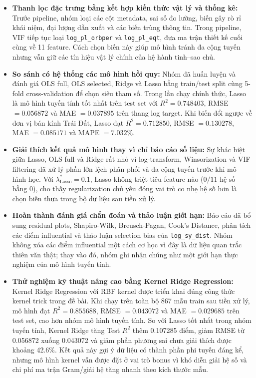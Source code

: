 \begin{itemize}[itemsep=0.15cm, topsep=0.1cm]
    \item \textbf{Thanh lọc đặc trưng bằng kết hợp kiến thức vật lý và thống kê:} Trước pipeline,
          nhóm loại các cột metadata, sai số đo lường, biến gây rò rỉ khái niệm, đại lượng dẫn
          xuất và các biến trùng thông tin. Trong pipeline, VIF tiếp tục loại
          \texttt{log\_pl\_orbper} và \texttt{log\_pl\_eqt}, đưa ma trận thiết kế cuối cùng về
          11 feature. Cách chọn biến này giúp mô hình tránh đa cộng tuyến nhưng vẫn giữ các tín
          hiệu vật lý chính của hệ hành tinh--sao chủ.

    \item \textbf{So sánh có hệ thống các mô hình hồi quy:} Nhóm đã huấn luyện và đánh giá
          OLS full, OLS selected, Ridge và Lasso bằng train/test split cùng 5-fold
          cross-validation để chọn siêu tham số. Trong lần chạy chính thức, Lasso là mô hình
          tuyến tính tốt nhất trên test set với $R^2=0.748403$, RMSE $=0.056872$ và
          MAE $=0.037895$ trên thang log target. Khi biến đổi ngược về đơn vị bán kính Trái Đất,
          Lasso đạt $R^2=0.712850$, RMSE $=0.130278$, MAE $=0.085171$ và MAPE $=7.032\%$.

    \item \textbf{Giải thích kết quả mô hình thay vì chỉ báo cáo số liệu:} Sự khác biệt giữa
          Lasso, OLS full và Ridge rất nhỏ vì log-transform, Winsorization và VIF filtering đã
          xử lý phần lớn lệch phân phối và đa cộng tuyến trước khi mô hình học. Với
          $\lambda^*_{\mathrm{Lasso}}=0.1$, Lasso không triệt tiêu feature nào ($0/11$ hệ số
          bằng 0), cho thấy regularization chủ yếu đóng vai trò co nhẹ hệ số hơn là chọn biến
          thưa trong bộ dữ liệu sau tiền xử lý.

    \item \textbf{Hoàn thành đánh giá chẩn đoán và thảo luận giới hạn:} Báo cáo đã bổ sung
          residual plots, Shapiro-Wilk, Breusch-Pagan, Cook's Distance, phân tích các điểm
          influential và thảo luận selection bias của \texttt{log\_sy\_dist}. Nhóm không xóa
          các điểm influential một cách cơ học vì đây là dữ liệu quan trắc thiên văn thật; thay
          vào đó, nhóm ghi nhận chúng như một giới hạn thực nghiệm của mô hình tuyến tính.

    \item \textbf{Thử nghiệm kỹ thuật nâng cao bằng Kernel Ridge Regression:} Kernel Ridge
          Regression với RBF kernel được triển khai đúng công thức kernel trick trong đề bài.
          Khi chạy trên toàn bộ 867 mẫu train sau tiền xử lý, mô hình đạt $R^2=0.855688$,
          RMSE $=0.043072$ và MAE $=0.029685$ trên test set, cao hơn nhóm mô hình tuyến tính.
          So với Lasso tốt nhất trong nhóm tuyến tính, Kernel Ridge tăng Test $R^2$ thêm
          0.107285 điểm, giảm RMSE từ 0.056872 xuống 0.043072 và giảm phần phương sai chưa
          giải thích được khoảng 42.6\%. Kết quả này gợi ý dữ liệu có thành phần phi tuyến
          đáng kể, nhưng mô hình kernel vẫn được đặt ở vai trò bonus vì khó diễn giải hệ số
          và chi phí ma trận Gram/giải hệ tăng nhanh theo kích thước mẫu.
\end{itemize}


